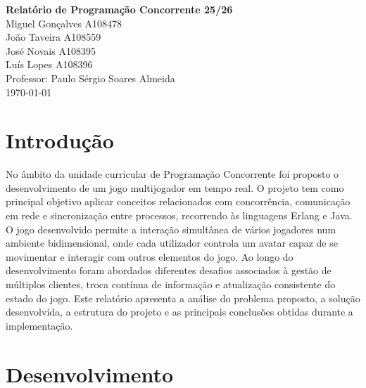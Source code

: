 \documentclass[11pt,a4paper]{article}
\begin{document}
\begin{center}

    \Large \textbf{Relatório de Programação Concorrente 25/26} \\[1cm]

    Miguel Gonçalves A108478 \\
    João Taveira A108559 \\
    José Novais A108395 \\
    Luís Lopes A108396 \\[1cm]

    Professor: Paulo Sérgio Soares Almeida \\[1cm]

    \today

\end{center}

\vspace{1cm}
\newpage


\renewcommand{\contentsname}{Índice}
\tableofcontents
\newpage


\section{Introdução}
No âmbito da unidade curricular de Programação Concorrente foi proposto o desenvolvimento de um jogo multijogador em tempo real. O projeto tem como principal objetivo aplicar conceitos relacionados com concorrência, comunicação em rede e sincronização entre processos, recorrendo às linguagens Erlang e Java.
O jogo desenvolvido permite a interação simultânea de vários jogadores num ambiente bidimensional, onde cada utilizador controla um avatar capaz de se movimentar e interagir com outros elementos do jogo.
Ao longo do desenvolvimento foram abordados diferentes desafios associados à gestão de múltiplos clientes, troca contínua de informação e atualização consistente do estado do jogo.
Este relatório apresenta a análise do problema proposto, a solução desenvolvida, a estrutura do projeto e as principais conclusões obtidas durante a implementação.
\newpage



\section{Desenvolvimento}
\end{document}
